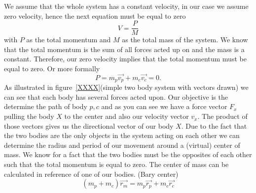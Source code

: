 \documentclass[11pt]{article} %
\begin{document}
We assume that the whole system has a constant velocity, in our case we assume zero velocity, hence the next equation must be equal to zero
\begin{equation}
	V = \frac{P}{M}	
\end{equation}
with $P$ as the total momentum and $M$ as the total mass of the system. We know that the total momentum is the sum of all forces acted up on and the mass is a constant. Therefore, our zero velocity implies that the total momentum must be equal to zero. Or more formally
\begin{equation}
	P = m_p\overrightarrow{v_p} + m_c\overrightarrow{v_c} = 0.
\end{equation}
As illustrated in figure~\ref{XXXX}(simple two body system with vectors drawn) we can see that each body has several forces acted upon. Our objective is the determine the path of body $p,c$ and as you can see we have a force vector $F_x$ pulling the body $X$ to the center and also our velocity vector $v_x$. The product of those vectors gives us the directional vector of our body $X$. Due to the fact that the two bodies are the only objects in the system acting on each other we can determine the radius and period of our movement around a (virtual) center of mass. We know for a fact that the two bodies must be the opposites of each other such that the total momentum is equal to zero. The center of mass can be calculated in reference of one of our bodies.  (Bary center)
\begin{equation}
	(m_p + m_c)\overrightarrow{r_{m}} = m_p\overrightarrow{r_p} + m_c\overrightarrow{r_c} 
\end{equation}
\end{document}
